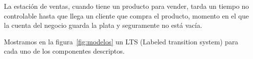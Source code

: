La estación de ventas, cuando tiene un producto para vender, tarda un tiempo no controlable hasta que llega un cliente que compra el producto, momento en el que la cuenta del negocio guarda la plata y seguramente no está vacía.

Mostramos en la figura~\ref{fig:modelos} un LTS (Labeled transition system) para cada uno de los componentes descriptos.


\begin{figure}[htb]
	\begin{center}
\end{center}
\end{figure}
